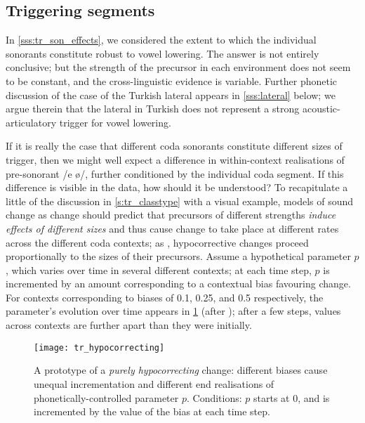 \subsection{Triggering segments}\label{ss:tr_codas}

In \cref{sss:tr_son_effects}, we considered the extent to which the individual sonorants constitute robust  to vowel lowering. The answer is not entirely conclusive; but the strength of the precursor in each environment does not seem to be constant, and the cross-linguistic evidence is variable. Further phonetic discussion of the case of the Turkish lateral appears in \cref{sss:lateral} below; we argue therein that the lateral in Turkish does not represent a strong acoustic-articulatory trigger for vowel lowering.

If it is really the case that different coda sonorants constitute different sizes of trigger, then we might well expect a difference in within-context realisations of pre-sonorant /e ø/, further conditioned by the individual coda segment. If this difference is visible in the data, how should it be understood? To recapitulate a little of the discussion in \cref{s:tr_classtype} with a visual example, models of sound change as  change \citep{Ohala1981} should predict that precursors of different strengths \emph{induce effects of different sizes} and thus cause change to take place at different rates across the different coda contexts; as \citet{Fruehwald2016}, hypocorrective changes proceed proportionally to the sizes of their precursors. Assume a hypothetical parameter $p$, which varies over time in several different contexts; at each time step, $p$ is incremented by an amount corresponding to a contextual bias favouring change. For contexts corresponding to biases of 0.1, 0.25, and 0.5 respectively, the parameter's evolution over time appears in \cref{fig:tr_hypo_example} (after \citealt[378]{Fruehwald2016}); after a few steps, values across contexts are further apart than they were initially.

\begin{figure}[H]
  \centering
  \texttt{[image: tr\_hypocorrecting]}
  \caption[A rough illustration of hypocorrection.]{A prototype of a \emph{purely hypocorrecting} change: different biases cause unequal incrementation and different end realisations of phonetically-controlled parameter $p$. Conditions: $p$ starts at 0, and is incremented by the value of the bias at each time step. }
  \label{fig:tr_hypo_example}
\end{figure}

